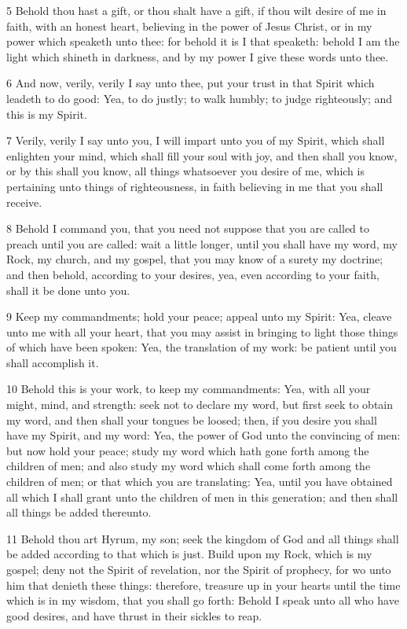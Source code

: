 				5 Behold thou hast a gift, or thou shalt have a gift, if thou wilt desire of me in faith, with an honest heart, believing in the power of Jesus Christ, or in my power which speaketh unto thee: for behold it is I that speaketh: behold I am the light which shineth in darkness, and by my power I give these words unto thee.

				6 And now, verily, verily I say unto thee, put your trust in that Spirit which leadeth to do good: Yea, to do justly; to walk humbly; to judge righteously; and this is my Spirit.

				7 Verily, verily I say unto you, I will impart unto you of my Spirit, which shall enlighten your mind, which shall fill your soul with joy, and then shall you know, or by this shall you know, all things whatsoever you desire of me, which is pertaining unto things of righteousness, in faith believing in me that you shall receive.

				8 Behold I command you, that you need not suppose that you are called to preach until you are called: wait a little longer, until you shall have my word, my Rock, my church, and my gospel, that you may know of a surety my doctrine; and then behold, according to your desires, yea, even according to your faith, shall it be done unto you.

				9 Keep my commandments; hold your peace; appeal unto my Spirit: Yea, cleave unto me with all your heart, that you may assist in bringing to light those things of which have been spoken: Yea, the translation of my work: be patient until you shall accomplish it.

				10 Behold this is your work, to keep my commandments: Yea, with all your might, mind, and strength: seek not to declare my word, but first seek to obtain my word, and then shall your tongues be loosed; then, if you desire you shall have my Spirit, and my word: Yea, the power of God unto the convincing of men: but now hold your peace; study my word which hath gone forth among the children of men; and also study my word which shall come forth among the children of men; or that which you are translating: Yea, until you have obtained all which I shall grant unto the children of men in this generation; and then shall all things be added thereunto.

				11 Behold thou art Hyrum, my son; seek the kingdom of God and all things shall be added according to that which is just. Build upon my Rock, which is my gospel; deny not the Spirit of revelation, nor the Spirit of prophecy, for wo unto him that denieth these things: therefore, treasure up in your hearts until the time which is in my wisdom, that you shall go forth: Behold I speak unto all who have good desires, and have thrust in their sickles to reap.

